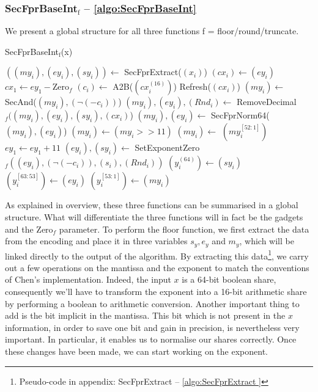 \documentclass[runningheads]{llncs}
\begin{document}
  
    \subsubsection{SecFprBaseInt$_\text{f}$ -- \autoref{algo:SecFprBaseInt}}
    We present a global structure for all three functions f = floor/round/truncate.
    \begin{algorithm}[H]
      \caption{SecFprBaseInt$_\text{f}$(x)}
      \label{algo:SecFprBaseInt}
      $((my_i), (ey_i), (sy_i)) \leftarrow$ SecFprExtract($(x_i)$)\;%
      $(cx_i) \leftarrow (ey_i)$\;
      $cx_1 \leftarrow ey_1 - \text{Zero}_f$\;%
      $(c_i) \leftarrow$ A2B($(cx_i^{(16)})$)\; 
      Refresh($(cx_i)$)\;
      $(my_i) \leftarrow$ SecAnd($(my_i), (\neg(-c_i))$)\;%
      $(my_i), (ey_i), (Rnd_i) \leftarrow$ RemoveDecimal$_f((my_i), (ey_i), (sy_i), (cx_i)$)\;%
      $(my_i), (ey_i) \leftarrow$ SecFprNorm64($(my_i),(ey_i)$)\;
      $(my_i) \leftarrow (my_i >> 11)$\;
      $(my_i) \leftarrow$ $(my_i^{[52:1]}) $\;
      $ey_1 \leftarrow ey_1 + 11$\;
      $(ey_i), (sy_i) \leftarrow$ SetExponentZero$_f((ey_i), (\neg(-c_i)), (s_i), (Rnd_i))$\;%
      $(y_i^{(64)}) \leftarrow (sy_i) $\;
      $(y_i^{[63:53]}) \leftarrow (ey_i) $\;
      $(y_i^{[53:1]}) \leftarrow (my_i) $\;
    \;
    \end{algorithm}
    As explained in overview, these three functions can be summarised in a global structure. 
    What will differentiate the three functions will in fact be the gadgets and the Zero$_f$ parameter.
    To perform the floor function, we first extract the data from the encoding and place it in three variables $s_y, e_y$ and $m_y$, which will be linked directly to the output of the algorithm. 
    By extracting this data\footnote{Pseudo-code in appendix: SecFprExtract -- \autoref{algo:SecFprExtract }}, we carry out a few operations on the mantissa and the exponent to match the conventions of Chen's implementation.
      Indeed, the input $x$ is a 64-bit boolean share, consequently we'll have to transform the exponent into a 16-bit arithmetic share by performing a boolean to arithmetic conversion.
      Another important thing to add is the bit implicit in the mantissa. 
      This bit which is not present in the $x$ information, in order to save one bit and gain in precision, is nevertheless very important.
      In particular, it enables us to normalise our shares correctly.
      Once these changes have been made, we can start working on the exponent.
\end{document}
